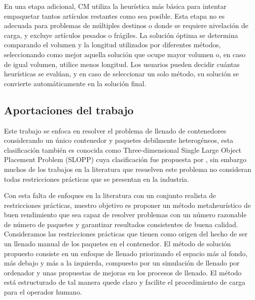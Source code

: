 En una etapa adicional, CM utiliza la heurística más básica para intentar empaquetar tantos artículos restantes como sea posible. Esta etapa no es adecuada para problemas de múltiples destinos o donde se requiere nivelación de carga, y excluye artículos pesados o frágiles. La solución óptima se determina comparando el volumen y la longitud utilizados por diferentes métodos, seleccionando como mejor aquella solución que ocupe mayor volumen o, en caso de igual volumen, utilice menos longitud. Los usuarios pueden decidir cuántas heurísticas se evalúan, y en caso de seleccionar un solo método, su solución se convierte automáticamente en la solución final.

\subsection{Aportaciones del trabajo}

Este trabajo se enfoca en resolver el problema de llenado de contenedores considerando un único contenedor y paquetes debilmente heterogéneos, esta clasificación también es conocida como Three-dimensional Single Large Object Placement Problem (SLOPP) cuya clasificación fue propuesta por \textcite{wascher2007improved}, sin embargo muchos de los trabajos en la literatura que resuelven este problema no consideran todas restricciones prácticas que se presentan en la industria.

Con esta falta de enfoques en la literatura con un conjunto realista de restricciones prácticas, nuestro objetivo es proponer un método metaheurístico de buen rendimiento que sea capaz de resolver problemas con un número razonable de número de paquetes y garantizar resultados consistentes de buena calidad. Consideramos las restricciones prácticas que tienen como origen del hecho de ser un llenado manual de los paquetes en el contenedor. El método de solución propuesto consiste en un enfoque de llenado priorizando el espacio más al fondo, más debajo y más a la izquierda, compuesto por un simulación de llenado por ordenador y unas propuestas de mejoras en los procesos de llenado. El método está estructurado de tal manera quede claro y facilite el procedimiento de carga para el operador humano.
